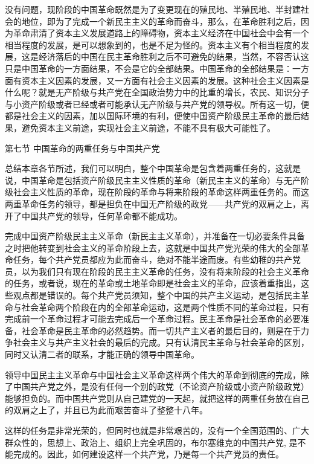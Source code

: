 \documentclass[UTF8, 12pt, a4paper]{ctexrep}
\begin{document}
没有问题，现阶段的中国革命既然是为了变更现在的殖民地、半殖民地、半封建社会的地位，即为了完成一个新民主主义的革命而奋斗，那么，在革命胜利之后，因为革命肃清了资本主义发展道路上的障碍物，资本主义经济在中国社会中会有一个相当程度的发展，是可以想象到的，也是不足为怪的。资本主义有个相当程度的发展，这是经济落后的中国在民主革命胜利之后不可避免的结果，当然，不容否认这只是中国革命的一方面结果，不会是它的全部结果。中国革命的全部结果是：一方面有资本主义因素的发展，又一方面有社会主义因素的发展。这种社会主义因素是什么呢？就是无产阶级与共产党在全国政治势力中的比重的增长，农民、知识分子与小资产阶级或者已经或者可能承认无产阶级与共产党的领导权。所有这一切，便都是社会主义的因素，加以国际环境的有利，便使中国资产阶级民主革命的最后结果，避免资本主义前途，实现社会主义前途，不能不具有极大可能性了。

第七节 中国革命的两重任务与中国共产党

总结本章各节所述，我们可以明白，整个中国革命是包含着两重任务的，这就是说，中国革命是包括资产阶级民主主义性质的革命（新民主主义的革命）与无产阶级社会主义性质的革命，现在阶段的革命与将来阶段的革命这样两重任务的。而这两重革命任务的领导，都是担负在中国无产阶级的政党——共产党的双肩之上，离开了中国共产党的领导，任何革命都不能成功。

完成中国资产阶级民主主义革命（新民主主义革命），并准备在一切必要条件具备之时把他转变到社会主义的革命阶段上去，这就是中国共产党光荣的伟大的全部革命任务，每个共产党员都应为此而奋斗，绝对不能半途而废。有些幼稚的共产党员，以为我们只有现在阶段的民主主义革命的任务，没有将来阶段的社会主义革命的任务，或者说，现在的革命或土地革命即是社会主义的革命，应该着重指出，这些观点都是错误的。每个共产党员须知，整个中国的共产主义运动，是包括民主革命与社会革命两个阶段在内的全部革命运动，这是两个性质不同的革命过程，只有完成前一个革命过程才可能去完成后一个革命过程。民主革命是社会革命的必要准备，社会革命是民主革命的必然趋势。而一切共产主义者的最后目的，则是在于力争社会主义与共产主义社会的最后的完成。只有认清民主革命与社会革命的区别，同时又认清二者的联系，才能正确的领导中国革命。

领导中国民主主义革命与中国社会主义革命这样两个伟大的革命到彻底的完成，除了中国共产党之外，是没有任何一个别的政党（不论资产阶级或小资产阶级政党）能够担负的。而中国共产党则从自己建党的一天起，就把这样的两重任务放在自己的双肩之上了，并且已为此而艰苦奋斗了整整十八年。

这样的任务是非常光荣的，但同时也就是非常艰苦的，没有一个全国范围的、广大群众性的，思想上、政治上、组织上完全巩固的，布尔塞维克的中国共产党, 是不能完成的。因此，如何建设这样一个共产党，乃是每一个共产党员的责任。
\end{document}
